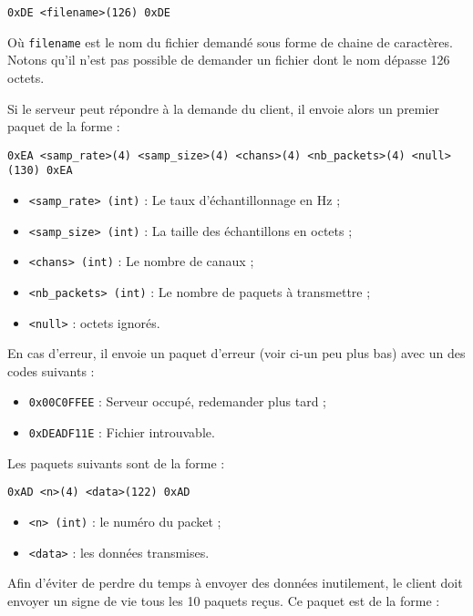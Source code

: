 \documentclass[a4paper,10pt,openany,oneside]{report}
\begin{document}
\begin{verbatim}
0xDE <filename>(126) 0xDE
\end{verbatim}

Où \texttt{filename} est le nom du fichier demandé sous forme de chaine de
caractères. Notons qu'il n'est pas possible de demander un fichier dont le nom
dépasse 126 octets.

Si le serveur peut répondre à la demande du client, il envoie alors un premier
paquet de la forme :

\begin{verbatim}
0xEA <samp_rate>(4) <samp_size>(4) <chans>(4) <nb_packets>(4) <null>(130) 0xEA
\end{verbatim}

\begin{itemize}
    \item \texttt{<samp\_rate> (int)} : Le taux d'échantillonnage en Hz ;
    \item \texttt{<samp\_size> (int)} : La taille des échantillons en octets ;
    \item \texttt{<chans> (int)} : Le nombre de canaux ;
    \item \texttt{<nb\_packets> (int)} : Le nombre de paquets à transmettre ;
    \item \texttt{<null>} : octets ignorés.
\end{itemize}

En cas d'erreur, il envoie un paquet d'erreur (voir ci-un peu plus bas) avec un
des codes suivants :

\begin{itemize}
    \item \texttt{0x00C0FFEE} : Serveur occupé, redemander plus tard ;
    \item \texttt{0xDEADF11E} : Fichier introuvable.
\end{itemize}

Les paquets suivants sont de la forme :

\begin{verbatim}
0xAD <n>(4) <data>(122) 0xAD
\end{verbatim}

\begin{itemize}
    \item \texttt{<n> (int)} : le numéro du packet ;
    \item \texttt{<data>} : les données transmises.
\end{itemize}

Afin d'éviter de perdre du temps à envoyer des données inutilement, le client
doit envoyer un signe de vie tous les 10 paquets reçus. Ce paquet est de la
forme :
\end{document}
